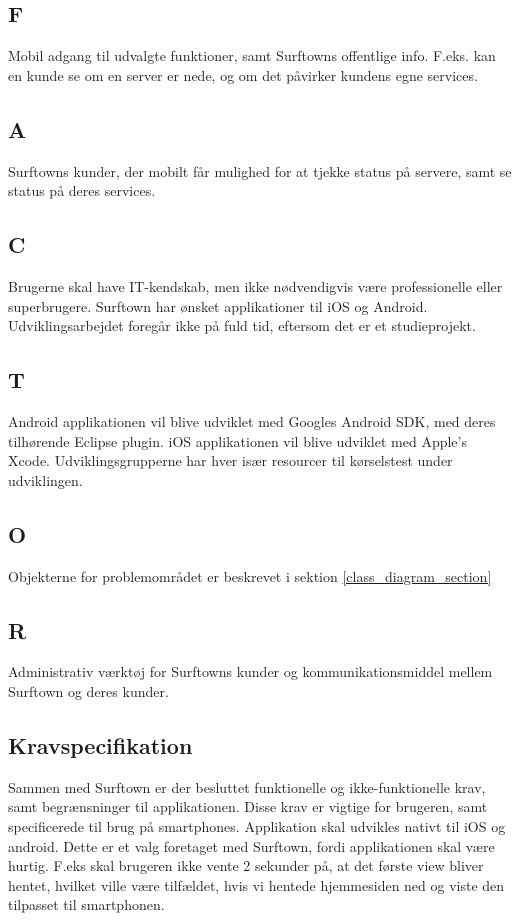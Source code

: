 \documentclass[12pt]{article}
\begin{document}
\subsection*{F}
Mobil adgang til udvalgte funktioner, samt Surftowns offentlige info. F.eks. kan en kunde se om en server er nede, og om det påvirker kundens egne services.
\subsection*{A}
Surftowns kunder, der mobilt får mulighed for at tjekke status på servere, samt se status på deres services.
\subsection*{C}
Brugerne skal have IT-kendskab, men ikke nødvendigvis være professionelle eller superbrugere. Surftown har ønsket applikationer til iOS og Android. Udviklingsarbejdet foregår ikke på fuld tid, eftersom det er et studieprojekt.
\subsection*{T}
Android applikationen vil blive udviklet med Googles Android SDK, med deres tilhørende Eclipse plugin. iOS applikationen vil blive udviklet med Apple's Xcode. Udviklingsgrupperne har hver især resourcer til kørselstest under udviklingen.
\subsection*{O}
Objekterne for problemområdet er beskrevet i sektion \ref{class_diagram_section}
\subsection*{R}
Administrativ værktøj for Surftowns kunder og kommunikationsmiddel mellem Surftown og deres kunder.

\subsection{Kravspecifikation}
Sammen med Surftown er der besluttet funktionelle og ikke-funktionelle krav, samt begrænsninger til applikationen. Disse krav er vigtige for brugeren, samt specificerede til brug på  smartphones. Applikation skal udvikles nativt til iOS og android. Dette er et valg foretaget med Surftown, fordi applikationen skal være hurtig. F.eks skal brugeren ikke vente 2 sekunder på, at det første view bliver hentet, hvilket ville være tilfældet, hvis vi hentede hjemmesiden ned og viste den tilpasset til smartphonen. 
\end{document}
